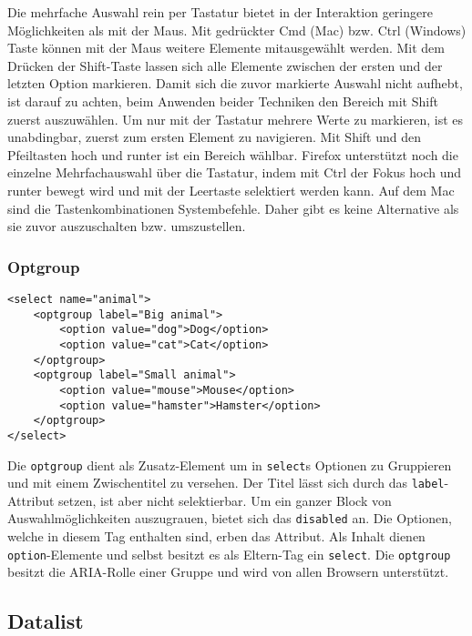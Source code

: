 Die mehrfache Auswahl rein per Tastatur bietet in der Interaktion geringere Möglichkeiten als mit der Maus.
Mit gedrückter Cmd (Mac) bzw. Ctrl (Windows) Taste können mit der Maus weitere Elemente mitausgewählt werden.
Mit dem Drücken der Shift-Taste lassen sich alle Elemente zwischen der ersten und der letzten Option markieren.
Damit sich die zuvor markierte Auswahl nicht aufhebt, ist darauf zu achten, beim Anwenden beider Techniken den Bereich mit Shift zuerst auszuwählen.
Um nur mit der Tastatur mehrere Werte zu markieren, ist es unabdingbar, zuerst zum ersten Element zu navigieren.
Mit Shift und den Pfeiltasten hoch und runter ist ein Bereich wählbar.
Firefox unterstützt noch die einzelne Mehrfachauswahl über die Tastatur, indem mit Ctrl der Fokus hoch und runter bewegt wird und mit der Leertaste selektiert werden kann.
Auf dem Mac sind die Tastenkombinationen Systembefehle.
Daher gibt es keine Alternative als sie zuvor auszuschalten bzw. umszustellen.


\subsubsection{\color{dgray} Optgroup}
\label{sec:optgroup}

\begin{lstlisting}[style = htmlcssjs, caption = Optgroup Example, label = code:OptgroupExample]
<select name="animal">
    <optgroup label="Big animal">
        <option value="dog">Dog</option>
        <option value="cat">Cat</option>
    </optgroup>
    <optgroup label="Small animal">
        <option value="mouse">Mouse</option>
        <option value="hamster">Hamster</option>
    </optgroup>
</select>
\end{lstlisting}

Die \texttt{optgroup} dient als Zusatz-Element um in \texttt{select}s Optionen zu Gruppieren und mit einem Zwischentitel zu versehen.
Der Titel lässt sich durch das \texttt{label}-Attribut setzen, ist aber nicht selektierbar. 
Um ein ganzer Block von Auswahlmöglichkeiten auszugrauen, bietet sich das \texttt{disabled} an.
Die Optionen, welche in diesem Tag enthalten sind, erben das Attribut.
Als Inhalt dienen \texttt{option}-Elemente und selbst besitzt es als Eltern-Tag ein \texttt{select}.
Die \texttt{optgroup} besitzt die ARIA-Rolle einer Gruppe und wird von allen Browsern unterstützt.


\subsection{Datalist}
\label{sec:datalist}


